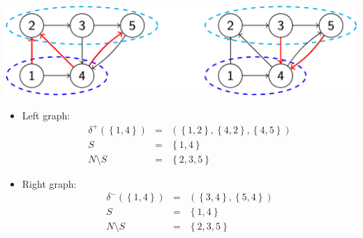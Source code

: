 \begin{examplebox}
    \begin{center}
        \includegraphics[width=.8\textwidth]{img/graphs-6.pdf}
    \end{center}

    \begin{itemize}
        \item Left graph: 
        \begin{equation*}
            \begin{array}{rcl}
                \delta^{+}\left(\left\{1,4\right\}\right) &=& \left(\left\{1,2\right\}, \left\{4,2\right\}, \left\{4,5\right\}\right) \\ [.5em]
                S &=& \left\{1,4\right\} \\ [.5em]
                N \setminus S &=& \left\{2,3,5\right\}
            \end{array}
        \end{equation*}

        \item Right graph: 
        \begin{equation*}
            \begin{array}{rcl}
                \delta^{-}\left(\left\{1,4\right\}\right) &=& \left(\left\{3,4\right\}, \left\{5,4\right\}\right) \\ [.5em]
                S &=& \left\{1,4\right\} \\ [.5em]
                N \setminus S &=& \left\{2,3,5\right\}
            \end{array}
        \end{equation*}
    \end{itemize}
\end{examplebox}